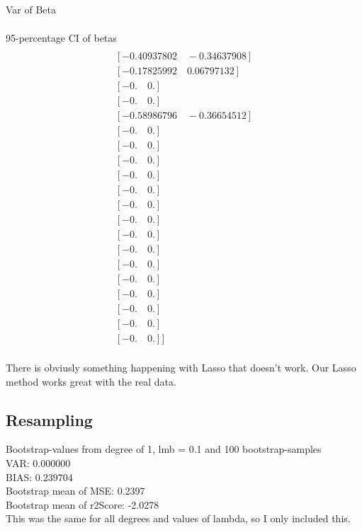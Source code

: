 \documentclass[a4paper,norsk]{article}
\begin{document}
Var of Beta
\begin{align*}
[ 0.   \quad       0.00025829 \quad 0.00394575\quad  0.     \quad     0.    \quad      0.00324571\\
  0.      \quad    0.     \quad     0.    \quad      0.    \quad      0.     \quad     0.    \quad      0.\\
  0.     \quad     0.   \quad       0.      \quad    0.     \quad     0.     \quad     0.   \quad       0.\\
  0.        ]
\end{align*}

95-percentage CI of betas
\begin{align*}
[[ 0.      \quad    0.        ]\\
 [-0.40937802\quad -0.34637908]\\
 [-0.17825992\quad  0.06797132]\\
 [-0.      \quad    0.        ]\\
 [-0.   \quad       0.        ]\\
 [-0.58986796\quad -0.36654512]\\
 [-0.    \quad      0.        ]\\
 [-0.   \quad       0.        ]\\
 [-0.    \quad      0.        ]\\
 [-0.   \quad       0.        ]\\
 [-0.     \quad     0.        ]\\
 [-0.     \quad     0.        ]\\
 [-0.   \quad       0.        ]\\
 [-0.    \quad      0.        ]\\
 [-0.    \quad      0.        ]\\
 [-0.    \quad      0.        ]\\
 [-0.     \quad     0.        ]\\
 [-0.    \quad      0.        ]\\
 [-0.    \quad      0.        ]\\
 [-0.   \quad       0.        ]\\
 [-0.    \quad      0.        ]]
\end{align*}
\\There is obviusly something happening with Lasso that doesn't work. Our Lasso method works great with the real data.
\subsection*{Resampling}
Bootstrap-values from degree of 1, lmb = 0.1 and 100 bootstrap-samples
\\VAR: 0.000000
\\BIAS: 0.239704
\\Bootstrap mean of MSE: 0.2397
\\Bootstrap mean of r2Score: -2.0278
\\This was the same for all degrees and values of lambda, so I only included this.
\clearpage
\end{document}
